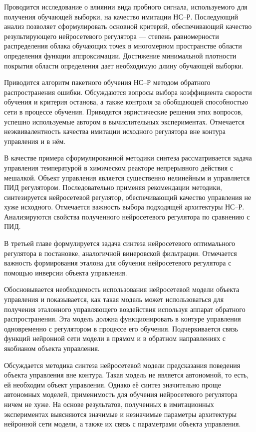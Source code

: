 Проводится исследование о влиянии вида пробного сигнала, используемого
для получения обучающей выборки, на качество имитации НС--Р.
Последующий анализ позволяет сформулировать основной критерий,
обеспечивающий качество результирующего нейросетевого регулятора ---
степень равномерности распределения облака обучающих точек в
многомерном пространстве области определения функции аппроксимации.
Достижение минимальной плотности покрытия области определения дает
необходимую длину обучающей выборки.

Приводится алгоритм пакетного обучения НС--Р методом обратного
распространения ошибки.  Обсуждаются вопросы выбора коэффициента
скорости обучения и критерия останова, а также контроля за обобщающей
способностью сети в процессе обучения.  Приводятся эвристические
решения этих вопросов, успешно используемые автором в вычислительных
экспериментах.  Отмечается неэквивалентность качества имитации
исходного регулятора вне контура управления и в нём.

В качестве примера сформулированной методики синтеза рассматривается
задача управления температурой в химическом реакторе непрерывного
действия с мешалкой.  Объект управления является существенно
нелинейным и управляется ПИД регулятором.  Последовательно применяя
рекомендации методики, синтезируется нейросетевой регулятор,
обеспечивающий качество управления не хуже исходного.  Отмечается
важность выбора подходящей архитектуры НС--Р.  Анализируются свойства
полученного нейросетевого регулятора по сравнению с ПИД.


В третьей главе формулируется задача синтеза нейросетевого
оптимального регулятора в постановке, аналогичной винеровской
фильтрации.  Отмечается важность формирования эталона для обучения
нейросетевого регулятора с помощью инверсии объекта управления.

Обосновывается необходимость использования нейросетевой модели объекта
управления и показывается, как такая модель может использоваться для
получения эталонного управляющего воздействия используя аппарат
обратного распространения.  Эта модель должна функционировать в
контуре управления одновременно с регулятором в процессе его обучения.
Подчеркивается связь функций нейронной сети модели в прямом и в
обратном направлениях с якобианом объекта управления.

Обсуждается методика синтеза нейросетевой модели предсказания
поведения объекта управления вне контура.  Такая модель не является
автономной, то есть, ей необходим объект управления.  Однако её синтез
значительно проще автономных моделей, применимость для обучения
нейросетевого регулятора ничем не хуже.  На основе результатов,
полученных в имитационных экспериментах выясняются значимые и
незначимые параметры архитектуры нейронной сети модели, а также их
связь с параметрами объекта управления.

